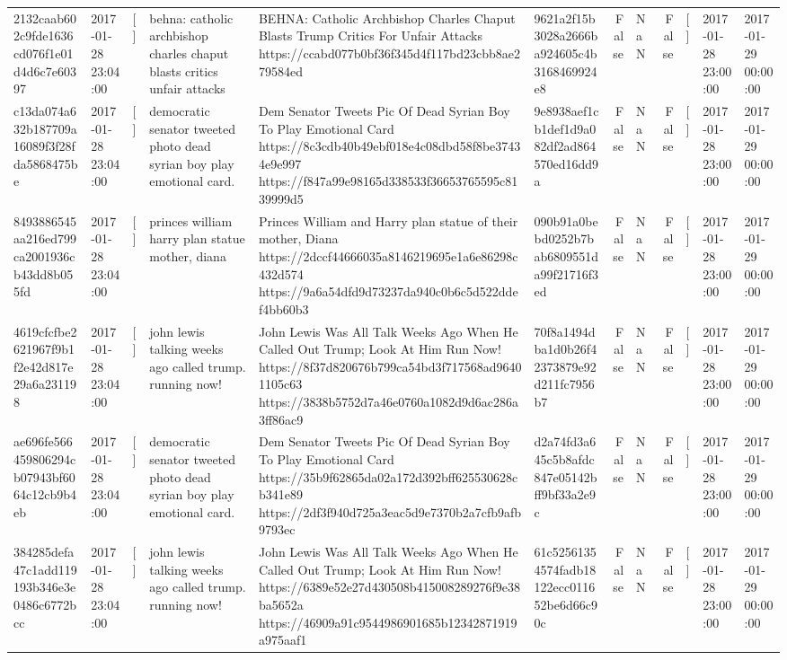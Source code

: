 \begin{tabular}{llllllrlrlll}
2132caab602c9fde1636cd076f1e01d4d6c7e60397 & 2017-01-28 23:04:00 & [] & behna: catholic archbishop charles chaput blasts critics unfair attacks & BEHNA: Catholic Archbishop Charles Chaput Blasts Trump Critics For Unfair Attacks https://ccabd077b0bf36f345d4f117bd23cbb8ae279584ed & 9621a2f15b3028a2666ba924605c4b3168469924e8 & False & NaN & False & [] & 2017-01-28 23:00:00 & 2017-01-29 00:00:00 \\
c13da074a632b187709a16089f3f28fda5868475be & 2017-01-28 23:04:00 & [] & democratic senator tweeted photo dead syrian boy play emotional card. & Dem Senator Tweets Pic Of Dead Syrian Boy To Play Emotional Card https://8c3cdb40b49ebf018e4c08dbd58f8be37434e9e997 https://f847a99e98165d338533f36653765595c8139999d5 & 9e8938aef1cb1def1d9a082df2ad864570ed16dd9a & False & NaN & False & [] & 2017-01-28 23:00:00 & 2017-01-29 00:00:00 \\
8493886545aa216ed799ca2001936cb43dd8b055fd & 2017-01-28 23:04:00 & [] & princes william harry plan statue mother, diana & Princes William and Harry plan statue of their mother, Diana https://2dccf44666035a8146219695e1a6e86298c432d574 https://9a6a54dfd9d73237da940c0b6c5d522ddef4bb60b3 & 090b91a0bebd0252b7bab6809551da99f21716f3ed & False & NaN & False & [] & 2017-01-28 23:00:00 & 2017-01-29 00:00:00 \\
4619cfcfbe2621967f9b1f2e42d817e29a6a231198 & 2017-01-28 23:04:00 & [] & john lewis talking weeks ago called trump. running now! & John Lewis Was All Talk Weeks Ago When He Called Out Trump; Look At Him Run Now! https://8f37d820676b799ca54bd3f717568ad96401105c63 https://3838b5752d7a46e0760a1082d9d6ac286a3ff86ac9 & 70f8a1494dba1d0b26f42373879e92d211fc7956b7 & False & NaN & False & [] & 2017-01-28 23:00:00 & 2017-01-29 00:00:00 \\
ae696fe566459806294cb07943bf6064c12cb9b4eb & 2017-01-28 23:04:00 & [] & democratic senator tweeted photo dead syrian boy play emotional card. & Dem Senator Tweets Pic Of Dead Syrian Boy To Play Emotional Card https://35b9f62865da02a172d392bff625530628cb341e89 https://2df3f940d725a3eac5d9e7370b2a7cfb9afb9793ec & d2a74fd3a645c5b8afdc847e05142bff9bf33a2e9c & False & NaN & False & [] & 2017-01-28 23:00:00 & 2017-01-29 00:00:00 \\
384285defa47c1add119193b346e3e0486c6772bcc & 2017-01-28 23:04:00 & [] & john lewis talking weeks ago called trump. running now! & John Lewis Was All Talk Weeks Ago When He Called Out Trump; Look At Him Run Now! https://6389e52e27d430508b415008289276f9e38ba5652a https://46909a91c9544986901685b12342871919a975aaf1 & 61c52561354574fadb18122ecc011652be6d66c90c & False & NaN & False & [] & 2017-01-28 23:00:00 & 2017-01-29 00:00:00 \\

\end{tabular}
